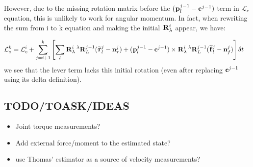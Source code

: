 \documentclass[11pt]{article}
\newcommand{\Rot}[2]{\prescript{#1}{}{\bfR}_{#2}}
\newcommand{\noise}{\bfn}
\newcommand{\posi}[2]{\prescript{#1}{}{\bfp}_{#2}}
\newcommand{\forcem}[2]{\prescript{#1}{}{\widetilde{\bff}}_{#2}}
\newcommand{\torquem}[2]{\prescript{#1}{}{\widetilde{\pmb{\tau}}}_{#2}}
\newcommand{\AM}{\mathcal{L}}
\newcommand{\COM}{\bfc}
\begin{document}
However, due to the missing rotation matrix before the $(\posi{}{l}^{j-1} - \COM^{j-1})$ term in $\AM_c$ equation, this is unlikely to work for angular momentum.
In fact, when rewriting the sum from i to k equation and making the initial $\Rot{}{\lambda}^i$ appear, we have:

\begin{equation}
	\begin{split}
	\AM_c^{k} &= \AM_c^{i} +  \sum_{j=i+1}^{k} \left[ 
	\sum_l \Rot{}{\lambda}^{i} \Rot{\lambda}{L}^{j-1} (\torquem{}{l}^{j} - \noise_{\tau}^{j}) + (\posi{}{l}^{j-1} - \COM^{j-1}) \times \Rot{}{\lambda}^{i} \Rot{\lambda}{L}^{j-1} (\forcem{}{l}^{j} - \noise_f^{j}) 
	\right] \delta t
	\end{split}
\end{equation}
we see that the lever term lacks this initial rotation (even after replacing $\COM^{j-1}$ using its delta definition). 







\subsection{TODO/TOASK/IDEAS}
\begin{itemize}
    \item Joint torque measurements?
    \item Add external force/moment to the estimated state? 
    \item use Thomas' estimator as a source of velocity measurements?
\end{itemize}
\end{document}
